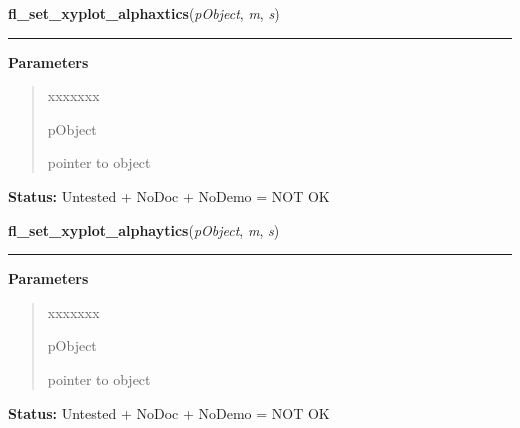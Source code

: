     \vspace{0.5ex}

\hspace{.8\funcindent}\begin{boxedminipage}{\funcwidth}

    \raggedright \textbf{fl\_set\_xyplot\_alphaxtics}(\textit{pObject}, \textit{m}, \textit{s})

    \vspace{-1.5ex}

    \rule{\textwidth}{0.5\fboxrule}
\setlength{\parskip}{2ex}
\setlength{\parskip}{1ex}
      \textbf{Parameters}
      \vspace{-1ex}

      \begin{quote}
        \begin{Ventry}{xxxxxxx}

          \item[pObject]

          pointer to object

        \end{Ventry}

      \end{quote}

\textbf{Status:} Untested + NoDoc + NoDemo = NOT OK



    \end{boxedminipage}

    \label{xformslib:library:fl_set_xyplot_alphaytics}

    \vspace{0.5ex}

\hspace{.8\funcindent}\begin{boxedminipage}{\funcwidth}

    \raggedright \textbf{fl\_set\_xyplot\_alphaytics}(\textit{pObject}, \textit{m}, \textit{s})

    \vspace{-1.5ex}

    \rule{\textwidth}{0.5\fboxrule}
\setlength{\parskip}{2ex}
\setlength{\parskip}{1ex}
      \textbf{Parameters}
      \vspace{-1ex}

      \begin{quote}
        \begin{Ventry}{xxxxxxx}

          \item[pObject]

          pointer to object

        \end{Ventry}

      \end{quote}

\textbf{Status:} Untested + NoDoc + NoDemo = NOT OK



    \end{boxedminipage}

